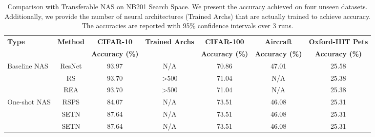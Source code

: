\documentclass[aspectratio=169,xcolor=dvipsnames]{beamer}
\begin{document}
\begin{frame}

    \begin{table}[h!]
        \centering
        \caption{Comparison with Transferable NAS on NB201 Search Space. We present the accuracy achieved on four unseen datasets. Additionally, we provide the number of neural architectures (Trained Archs) that are actually trained to achieve accuracy. The accuracies are reported with 95\% confidence intervals over 3 runs.}
        \label{tab:table1}
        \begin{tabular}{lS[table-format=2.2]cS[table-format=2.2]cS[table-format=2.2]c}
            \toprule
            \textbf{Type}      & {\textbf{Method}} & {\textbf{CIFAR-10}}      & {\textbf{Trained Archs}} & {\textbf{CIFAR-100}}     & {\textbf{Aircraft}}      & {\textbf{Oxford-IIIT Pets}} \\
            \textbf{}          & {}                & {\textbf{Accuracy (\%)}} & {}                       & {\textbf{Accuracy (\%)}} & {\textbf{Accuracy (\%)}} & {\textbf{Accuracy (\%)}}    \\
            \midrule
            {Baseline NAS}     & {ResNet}          & 93.97                    & N/A                      & 70.86                    & 47.01                    & 25.58                       \\
                               & {RS}              & 93.70                    & >500                     & 71.04                    & {N/A}                    & 25.38                       \\
                               & {REA}             & 93.70                    & >500                     & 71.04                    & {N/A}                    & 25.38                       \\
            \midrule
            {One-shot NAS}     & {RSPS}            & 84.07                    & N/A                      & 73.51                    & 46.08                    & 25.31                       \\
                               & {SETN}            & 87.64                    & N/A                      & 73.51                    & 46.08                    & 25.31                       \\
                               & {SETN}            & 87.64                    & N/A                      & 73.51                    & 46.08                    & 25.31                       \\

\end{tabular}
\end{table}
\end{frame}
\end{document}
